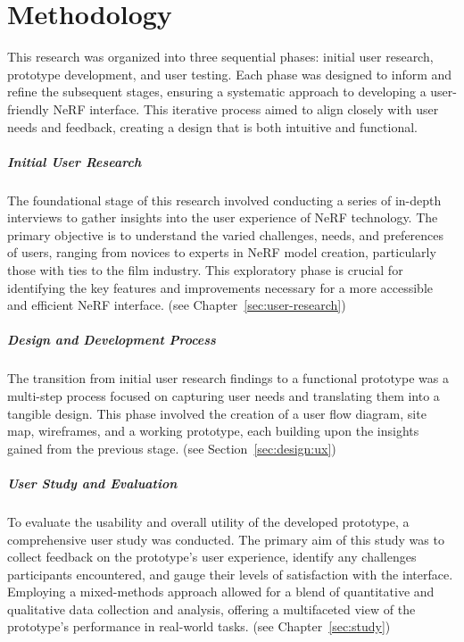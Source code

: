 %
\chapter{Methodology}
\label{sec:methodology}

This research was organized into three sequential phases: initial user research, prototype development, and user testing. 
Each phase was designed to inform and refine the subsequent stages, ensuring a systematic approach to developing a user-friendly NeRF interface. 
This iterative process aimed to align closely with user needs and feedback, creating a design that is both intuitive and functional.

\paragraph{Initial User Research}

The foundational stage of this research involved conducting a series of in-depth interviews to gather insights into the user experience of NeRF technology. 
The primary objective is to understand the varied challenges, needs, and preferences of users, ranging from novices to experts in NeRF model creation, particularly those with ties to the film industry. 
This exploratory phase is crucial for identifying the key features and improvements necessary for a more accessible and efficient NeRF interface. (see Chapter~\ref{sec:user-research})

\paragraph{Design and Development Process}

The transition from initial user research findings to a functional prototype was a multi-step process focused on capturing user needs and translating them into a tangible design. 
This phase involved the creation of a user flow diagram, site map, wireframes, and a working prototype, each building upon the insights gained from the previous stage. (see Section~\ref{sec:design:ux})

\paragraph{User Study and Evaluation}

To evaluate the usability and overall utility of the developed prototype, a comprehensive user study was conducted. 
The primary aim of this study was to collect feedback on the prototype's user experience, identify any challenges participants encountered, and gauge their levels of satisfaction with the interface. 
Employing a mixed-methods approach allowed for a blend of quantitative and qualitative data collection and analysis, offering a multifaceted view of the prototype's performance in real-world tasks. (see Chapter~\ref{sec:study})